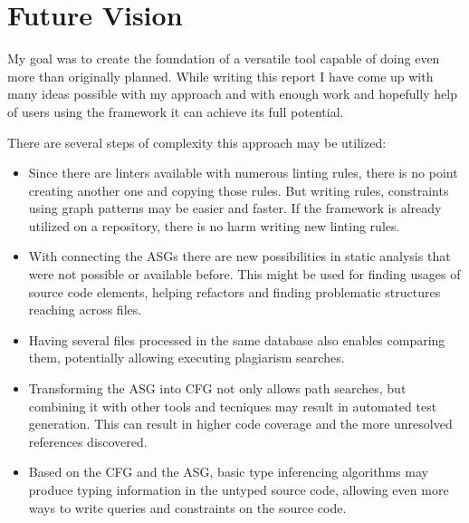 \chapter{Future Vision}
\label{chap:future-vision}

My goal was to create the foundation of a versatile tool capable of doing even more than originally planned. While writing this report I have come up with many ideas possible with my approach and with enough work and hopefully help of users using the framework it can achieve its full potential.

There are several steps of complexity this approach may be utilized:

\begin{itemize}[topsep=0pt]
  \item Since there are linters available with numerous linting rules, there is no point creating another one and copying those rules. But writing rules, constraints using graph patterns may be easier and faster. If the framework is already utilized on a repository, there is no harm writing new linting rules.

  \item With connecting the ASGs there are new possibilities in static analysis that were not possible or available before. This might be used for finding usages of source code elements, helping refactors and finding problematic structures reaching across files.

  \item Having several files processed in the same database also enables comparing them, potentially allowing executing plagiarism searches.

  \item Transforming the ASG into CFG not only allows path searches, but combining it with other tools and tecniques may result in automated test generation. This can result in higher code coverage and the more unresolved references discovered.

  \item Based on the CFG and the ASG, basic type inferencing algorithms may produce typing information in the untyped source code, allowing even more ways to write queries and constraints on the source code.
\end{itemize}
